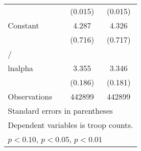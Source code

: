 \begin{table}[htbp]
\begin{tabular}{l*{2}{c}}
                    &     (0.015)        &     (0.015)        \\
[1em]
Constant            &       4.287\sym{**}&       4.326\sym{**}\\
                    &     (0.716)        &     (0.717)        \\
\hline
/                   &                    &                    \\
lnalpha             &       3.355\sym{**}&       3.346\sym{**}\\
                    &     (0.186)        &     (0.181)        \\
\hline
Observations        &      442899        &      442899        \\
\hline\hline
\multicolumn{3}{l}{\footnotesize Standard errors in parentheses}\\
\multicolumn{3}{l}{\footnotesize Dependent variables is troop counts.}\\
\multicolumn{3}{l}{\footnotesize \sym{+} \(p<0.10\), \sym{*} \(p<0.05\), \sym{**} \(p<0.01\)}\\
\end{tabular}
\end{table}
